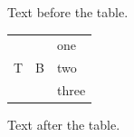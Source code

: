 \documentclass[12pt]{article}
\begin{document}
Text before the table.

\begin{tabular}{|l|l|l|}\hline \multirow[t]{3}{*}{T} & \multirow[b]{3}{*}{B} & one\\ & & two\\ & & three\\\hline\end{tabular}

Text after the table.
\end{document}
